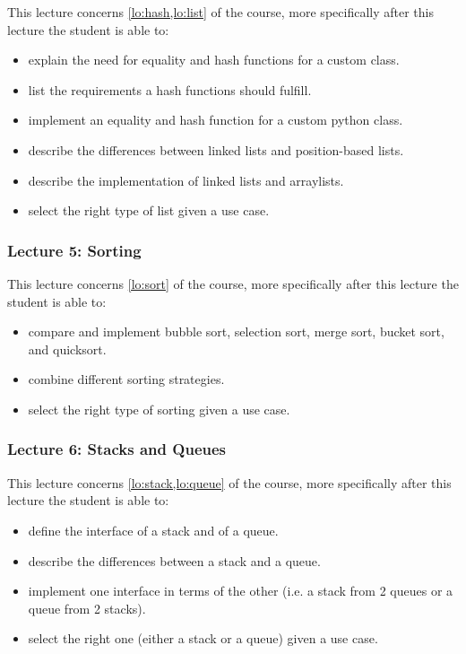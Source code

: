 This lecture concerns \cref{lo:hash,lo:list} of the course, more specifically after this lecture the student is able
to:
\begin{itemize}
	\item explain the need for equality and hash functions for a custom class.
	\item list the requirements a hash functions should fulfill.
	\item implement an equality and hash function for a custom python class.
	\item describe the differences between linked lists and position-based lists.
	\item describe the implementation of linked lists and arraylists.
	\item select the right type of list given a use case.
\end{itemize}

\subsubsection*{Lecture 5: Sorting}
\label{sub:lecture_5}

This lecture concerns \cref{lo:sort} of the course, more specifically after this lecture the student is able
to:
\begin{itemize}
	\item compare and implement bubble sort, selection sort, merge sort, bucket sort, and quicksort.
	\item combine different sorting strategies.
	\item select the right type of sorting given a use case.
\end{itemize}

\subsubsection*{Lecture 6: Stacks and Queues}
\label{ssub:lecture_6}

This lecture concerns \cref{lo:stack,lo:queue} of the course, more specifically after this lecture the student is able
to:
\begin{itemize}
	\item define the interface of a stack and of a queue.
	\item describe the differences between a stack and a queue.
	\item implement one interface in terms of the other (i.e. a stack from 2 queues or a queue from 2 stacks).
	\item select the right one (either a stack or a queue) given a use case.
\end{itemize}

